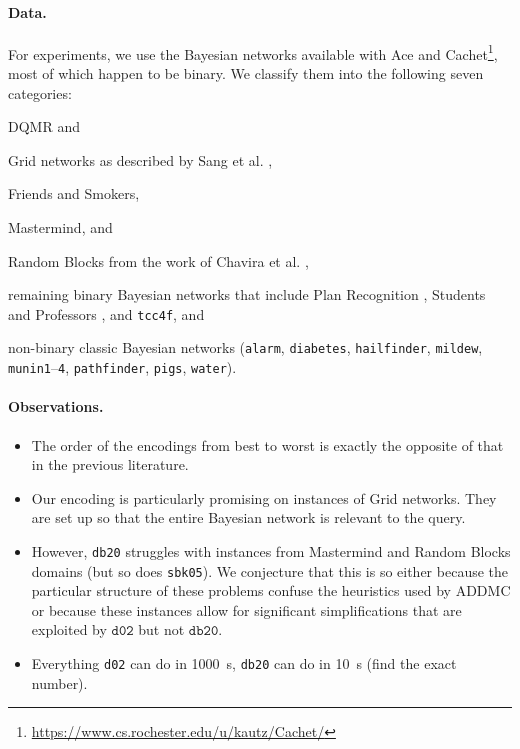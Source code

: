 \documentclass{article}
\theoremstyle{definition}
\theoremstyle{remark}
\begin{document}
\paragraph{Data.} For experiments, we use the Bayesian networks available
with Ace and
Cachet\footnote{\url{https://www.cs.rochester.edu/u/kautz/Cachet/}}, most of
which happen to be binary. We classify them into the following seven categories:
\begin{itemize*}
\item DQMR and
\item Grid networks as described by Sang et al. \cite{DBLP:conf/aaai/SangBK05},
\item Friends and Smokers,
\item Mastermind, and
\item Random Blocks from the work of Chavira et al.
  \cite{DBLP:journals/ijar/ChaviraDJ06},
\item remaining binary Bayesian networks that include Plan Recognition
  \cite{DBLP:conf/aaai/SangBK05}, Students and Professors
  \cite{DBLP:journals/ijar/ChaviraDJ06}, and \texttt{tcc4f}, and
\item non-binary classic Bayesian networks (\texttt{alarm}, \texttt{diabetes},
  \texttt{hailfinder}, \texttt{mildew}, \texttt{munin1}--\texttt{4},
  \texttt{pathfinder}, \texttt{pigs}, \texttt{water}).
\end{itemize*}

\paragraph{Observations.}
\begin{itemize}
\item The order of the encodings from best to worst is exactly the opposite of
  that in the previous literature.
\item Our encoding is particularly promising on instances of Grid networks.
  They are set up so that the entire Bayesian network is relevant to the
  query.
\item However, \texttt{db20} struggles with instances from Mastermind and
  Random Blocks domains (but so does \texttt{sbk05}). We conjecture that this
  is so either because the particular structure of these problems confuse the
  heuristics used by ADDMC or because these instances allow for significant
  simplifications that are exploited by $\mathtt{d02}$ but not
  $\mathtt{db20}$.
\item Everything \texttt{d02} can do in \SI{1000}{\second}, \texttt{db20} can do
  in \SI{10}{\second} (find the exact number).
\end{itemize}
\end{document}
